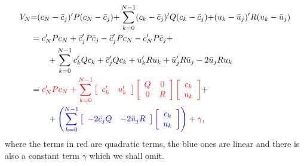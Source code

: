 \documentclass[12pt]{scrartcl}
\newcommand{\bcj}{\bar{c}_j}
\newcommand{\buj}{\bar{u}_j}
\begin{document}
\begin{align*}
V_N &{=} (c_N-\bcj)'P(c_N-\bcj) {+} \sum_{k=0}^{N-1}(c_k-\bcj)'Q(c_k-\bcj){+} 
		(u_k-\buj)'R(u_k-\buj)\\
		&= c_N' P c_N + \bcj' P \bcj - \bcj' P c_N - c_N' P \bcj +\\
		  &\qquad + \sum_{k=0}^{N-1} c_k' Q c_k + \bcj' Q c_k + u_k' R u_k + \buj' R \buj - 2\buj R u_k\\
		&=\textcolor{red}{c_N' P c_N + \sum_{k=0}^{N-1} \left[ \begin{array}{cc}c_k' & u_k'\end{array}\right]
\left[ \begin{array}{cc}
Q & 0\\0 & R
\end{array}\right]
\left[ \begin{array}{c}
c_k\\
u_k
\end{array}\right]}+\\
&\qquad+\textcolor{blue}{\left( 
\sum_{k=0}^{N-1}\left[ \begin{array}{cc}
-2\bcj Q & -2\buj R
\end{array}\right]\left[ 
\begin{array}{c}
c_k\\u_k
\end{array}\right]
\right)}+\textcolor{magenta}{\gamma},
\end{align*}
where the terms in red are quadratic terms, the blue ones are linear and
there is also a constant term $\gamma$ which we shall omit.
\end{document}
